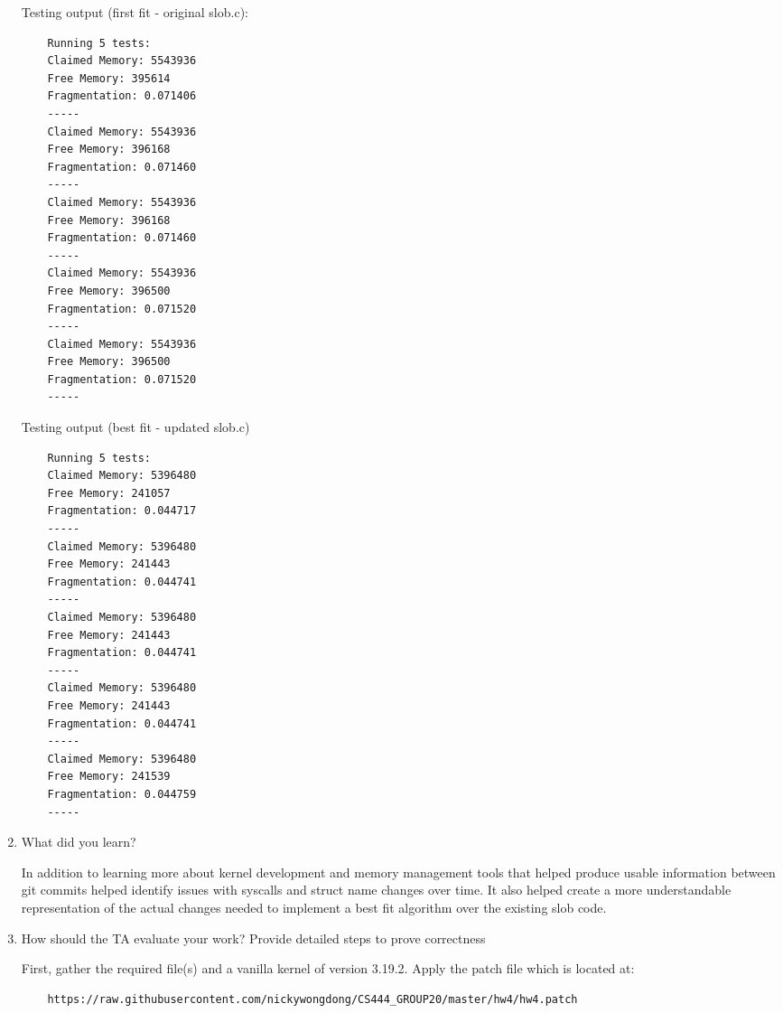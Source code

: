 \documentclass[onecolumn, draftclsnofoot,10pt, compsoc]{IEEEtran}
\begin{document}
\begin{enumerate}
Testing output (first fit - original slob.c):
    \begin{lstlisting}
    Running 5 tests:
    Claimed Memory: 5543936
    Free Memory: 395614
    Fragmentation: 0.071406
    -----
    Claimed Memory: 5543936
    Free Memory: 396168
    Fragmentation: 0.071460
    -----
    Claimed Memory: 5543936
    Free Memory: 396168
    Fragmentation: 0.071460
    -----
    Claimed Memory: 5543936
    Free Memory: 396500
    Fragmentation: 0.071520
    -----
    Claimed Memory: 5543936
    Free Memory: 396500
    Fragmentation: 0.071520
    -----
  \end{lstlisting}
  
\newpage
Testing output (best fit - updated slob.c)  
  
  \begin{lstlisting}
    Running 5 tests:
    Claimed Memory: 5396480
    Free Memory: 241057
    Fragmentation: 0.044717
    -----
    Claimed Memory: 5396480
    Free Memory: 241443
    Fragmentation: 0.044741
    -----
    Claimed Memory: 5396480
    Free Memory: 241443
    Fragmentation: 0.044741
    -----
    Claimed Memory: 5396480
    Free Memory: 241443
    Fragmentation: 0.044741
    -----
    Claimed Memory: 5396480
    Free Memory: 241539
    Fragmentation: 0.044759
    -----
  \end{lstlisting}

    \item What did you learn?
    \begin{singlespace} 

 In addition to learning more about kernel development and memory management tools that helped produce usable information between git commits helped identify issues with syscalls and struct name changes over time. It also helped create a more understandable representation of the actual changes needed to implement a best fit algorithm over the existing slob code. 
 
\end{singlespace}
    
    \item How should the TA evaluate your work? Provide detailed steps to prove correctness
    
    \begin{singlespace}
  First, gather the required file(s) and a vanilla kernel of version 3.19.2. Apply the patch file which is located at:
    \end{singlespace}
    
    \begin{lstlisting}
    https://raw.githubusercontent.com/nickywongdong/CS444_GROUP20/master/hw4/hw4.patch
    \end{lstlisting}
    

\end{enumerate}
\end{document}
